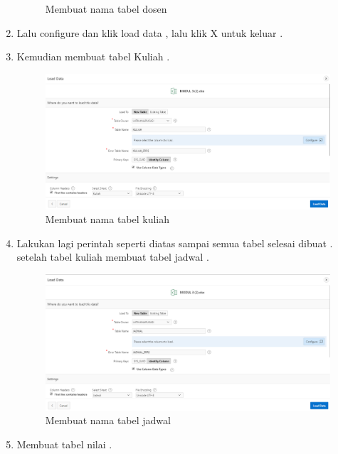 \begin{enumerate}
\begin{figure}[!htbp]
        \caption{Membuat nama tabel dosen}
        \label{fig:my_label}
    \end{figure}
\newline
    \item Lalu configure dan klik load data , lalu klik X untuk keluar .
    \newline
    \item Kemudian membuat tabel Kuliah .
    \begin{figure}[!htbp]
        \centering
        \includegraphics[scale=0.5]{figures/8.png}
        \caption{Membuat nama tabel kuliah}
        \label{fig:my_label}
    \end{figure}
    \newline
    \item Lakukan lagi perintah seperti diatas sampai semua tabel selesai dibuat . setelah tabel kuliah membuat tabel jadwal .
    \newline
    \begin{figure}[!htbp]
        \centering
        \includegraphics[scale=0.5]{figures/9.png}
        \caption{Membuat nama tabel jadwal}
        \label{fig:my_label}
    \end{figure}
    \newline
    \item Membuat tabel nilai . 

\end{enumerate}
